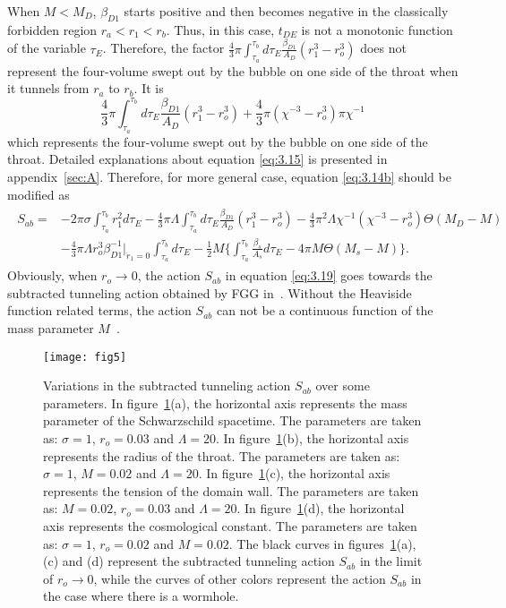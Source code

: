\documentclass[12pt]{article}
\begin{document}
When $M<M_{D}$, $\beta_{D1}$ starts positive and then becomes negative in the classically forbidden region $r_{a}<r_{1}<r_{b}$.  Thus, in this case, $t_{DE}$ is not a monotonic function of the variable $\tau_{E}$. Therefore, the factor $\frac{4}{3}\pi\int_{\tau_{a}}^{\tau_{b}}d\tau_{E}\frac{\beta_{D1}}{A_{D}}(r_{1}^{3}-r_{o}^{3})$ does not represent the four-volume swept out by the bubble on one side of the throat when it tunnels from $r_{a}$ to $r_{b}$. It is
\begin{equation}
\label{eq:3.15}%
\frac{4}{3}\pi\int_{\tau_{a}}^{\tau_{b}}d\tau_{E}\frac{\beta_{D1}}{A_{D}}(r_{1}^{3}-r_{o}^{3})+\frac{4}{3}\pi(\chi^{-3}- r_{o}^{3})\pi\chi^{-1}%
\end{equation}
which represents the four-volume swept out by the bubble on one side of the throat. Detailed explanations about equation \eqref{eq:3.15} is presented in appendix~\ref{sec:A}.  Therefore, for more general case, equation \eqref{eq:3.14b} should be modified as
\begin{eqnarray}\begin{split}
\label{eq:3.19}%
S_{ab}=&-2\pi\sigma \int_{\tau_{a}}^{\tau_{b}}r_{1}^{2}d\tau_{E}-\frac{4}{3}\pi\Lambda\int_{\tau_{a}}^{\tau_{b}}d\tau_{E}\frac{\beta_{D1}}{A_{D}}(r_{1}^{3}-r_{o}^{3})-\frac{4}{3}\pi^{2}\Lambda\chi^{-1}(\chi^{-3}-r_{o}^{3})\Theta(M_{D}-M)
\\&-\frac{4}{3}\pi\Lambda r_{o}^{3}\beta_{D1}^{-1}\Big|_{\dot{r}_{1}=0}\int_{\tau_{a}}^{\tau_{b}}d\tau_{E}-\frac{1}{2}M\big\{\int_{\tau_{a}}^{\tau_{b}}\frac{\beta_{s}}{A_{s}}d\tau_{E}-4\pi M\Theta(M_{s}-M)\big\}.
\end{split}
\end{eqnarray}
Obviously, when $r_{o}\rightarrow 0$, the action $S_{ab}$ in equation \eqref{eq:3.19} goes towards the subtracted tunneling action obtained by FGG in~\cite{EAJ}. Without the Heaviside function related terms, the action $S_{ab}$ can not be a continuous function of the mass parameter $M$~\cite{EAJ}.


\begin{figure}[tbp]
\centering
\texttt{[image: fig5]}
\caption{\label{fig:7} Variations in the subtracted tunneling action $S_{ab}$ over some parameters. In figure~\ref{fig:7}(a), the horizontal axis represents the mass parameter of the Schwarzschild spacetime. The parameters are taken as: $\sigma=1$, $r_{o}=0.03$ and $\Lambda=20$. In figure~\ref{fig:7}(b), the horizontal axis represents the radius of the throat. The parameters are taken as: $\sigma=1$, $M=0.02$ and $\Lambda=20$. In figure~\ref{fig:7}(c), the horizontal axis represents the tension of the domain wall. The parameters are taken as: $M=0.02$, $r_{o}=0.03$ and $\Lambda=20$. In figure~\ref{fig:7}(d), the horizontal axis represents the cosmological constant. The parameters are taken as: $\sigma=1$, $r_{o}=0.02$ and $M=0.02$. The black curves in figures~\ref{fig:7}(a), (c) and (d) represent the subtracted tunneling action $S_{ab}$ in the limit of $r_{o}\rightarrow 0$, while the curves of other colors represent the action $S_{ab}$ in the case where there is a wormhole. }
\end{figure}
\end{document}
